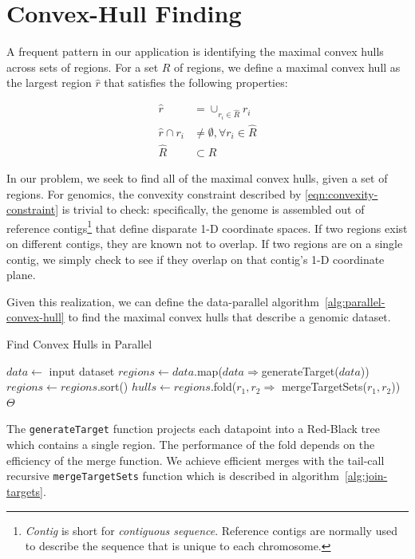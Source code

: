 \documentclass{acm_proc_article-sp}
\begin{document}
\section{Convex-Hull Finding}
\label{sec:convex-hull}

A frequent pattern in our application is identifying the maximal convex hulls across sets of regions. For
a set $R$ of regions, we define a maximal convex hull as the largest region $\hat{r}$ that satisfies the
following properties:

\begin{align}
\label{eqn:convexity-constraint}
\hat{r} &= \cup_{r_i \in \hat{R}} r_i \\
\hat{r} \cap r_i &\ne \emptyset, \forall r_i \in \hat{R} \\
\hat{R} &\subset R
\end{align}

In our problem, we seek to find all of the maximal convex hulls, given a set of regions. For genomics, the
convexity constraint described by \eqref{eqn:convexity-constraint} is trivial to check: specifically, the
genome is assembled out of reference contigs\footnote{\emph{Contig} is short for \emph{contiguous
sequence}. Reference contigs are normally used to describe the sequence that is unique to each
chromosome.} that define disparate 1-D coordinate spaces. If two regions exist on different contigs, they
are known not to overlap. If two regions are on a single contig, we simply check to see if they overlap
on that contig's 1-D coordinate plane.

Given this realization, we can define the data-parallel algorithm~\ref{alg:parallel-convex-hull} to find the
maximal convex hulls that describe a genomic dataset.

\begin{algorithm}
\caption{Find Convex Hulls in Parallel}
\label{alg:parallel-convex-hull}
\begin{algorithmic}
\STATE $data \leftarrow$ input dataset
\STATE $regions \leftarrow data$.map($data \Rightarrow $generateTarget($data$))
\STATE $regions \leftarrow regions$.sort()
\STATE $hulls \leftarrow regions$.fold($r_1, r_2 \Rightarrow$ mergeTargetSets($r_1, r_2$))
\RETURN $\Theta$
\end{algorithmic}
\end{algorithm}

The \texttt{generateTarget} function projects each datapoint into a Red-Black tree which contains a
single region. The performance of the fold depends on the efficiency of the merge function. We achieve
efficient merges with the tail-call recursive \texttt{mergeTargetSets} function which is described in
algorithm~\ref{alg:join-targets}.
\end{document}
